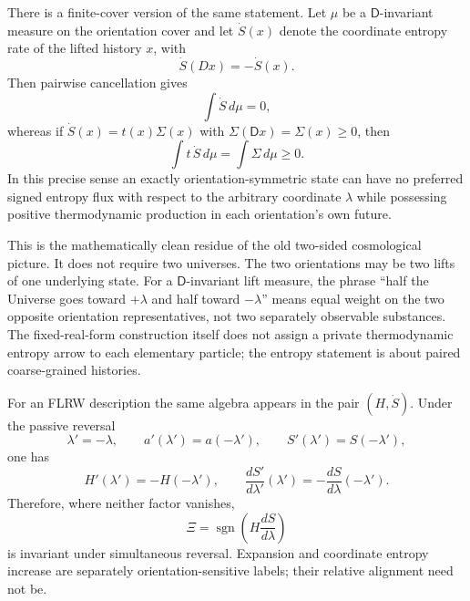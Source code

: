 \documentclass[11pt]{article}
\newcommand{\sgn}{\operatorname{sgn}}
\theoremstyle{definition}\newtheorem{definition}[theorem]{Definition}
\theoremstyle{remark}\newtheorem{remark}[theorem]{Remark}\newtheorem{conjecture}[theorem]{Conjecture}
\begin{document}
There is a finite-cover version of the same statement. Let $\mu$ be a $\mathsf D$-invariant measure on the orientation cover and let $\dot S(x)$ denote the coordinate entropy rate of the lifted history $x$, with
\begin{equation}
 \dot S(Dx)=-\dot S(x).
\end{equation}
Then pairwise cancellation gives
\begin{equation}\label{eq:signedentropycancel}
 \int \dot S\,d\mu=0,
\end{equation}
whereas if $\dot S(x)=t(x)\Sigma(x)$ with $\Sigma(\mathsf D x)=\Sigma(x)\ge0$, then
\begin{equation}\label{eq:orientedentropypositive}
 \int t\,\dot S\,d\mu=\int\Sigma\,d\mu\ge0.
\end{equation}
In this precise sense an exactly orientation-symmetric state can have no preferred signed entropy flux with respect to the arbitrary coordinate $\lambda$ while possessing positive thermodynamic production in each orientation's own future.

This is the mathematically clean residue of the old two-sided cosmological picture. It does not require two universes. The two orientations may be two lifts of one underlying state. For a $\mathsf D$-invariant lift measure, the phrase ``half the Universe goes toward $+\lambda$ and half toward $-\lambda$'' means equal weight on the two opposite orientation representatives, not two separately observable substances. The fixed-real-form construction itself does not assign a private thermodynamic entropy arrow to each elementary particle; the entropy statement is about paired coarse-grained histories.

For an FLRW description the same algebra appears in the pair $(H,\dot S)$. Under the passive reversal
\begin{equation}
 \lambda'=-\lambda,\qquad a'(\lambda')=a(-\lambda'),\qquad S'(\lambda')=S(-\lambda'),
\end{equation}
one has
\begin{equation}\label{eq:HSflip}
 H'(\lambda')=-H(-\lambda'),\qquad
 \frac{dS'}{d\lambda'}(\lambda')=-\frac{dS}{d\lambda}(-\lambda').
\end{equation}
Therefore, where neither factor vanishes,
\begin{equation}\label{eq:Xi}
 \boxed{\Xi=\sgn\!\left(H\frac{dS}{d\lambda}\right)}
\end{equation}
is invariant under simultaneous reversal. Expansion and coordinate entropy increase are separately orientation-sensitive labels; their relative alignment need not be.
\end{document}
